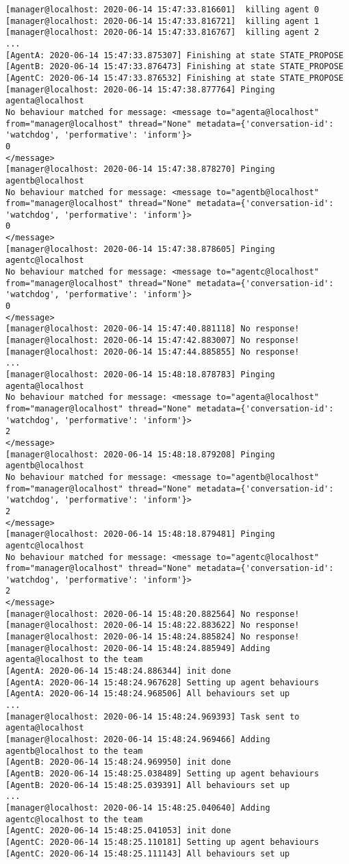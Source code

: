 \begin{lstlisting}
[manager@localhost: 2020-06-14 15:47:33.816601]  killing agent 0
[manager@localhost: 2020-06-14 15:47:33.816721]  killing agent 1
[manager@localhost: 2020-06-14 15:47:33.816767]  killing agent 2
...
[AgentA: 2020-06-14 15:47:33.875307] Finishing at state STATE_PROPOSE
[AgentB: 2020-06-14 15:47:33.876473] Finishing at state STATE_PROPOSE
[AgentC: 2020-06-14 15:47:33.876532] Finishing at state STATE_PROPOSE
[manager@localhost: 2020-06-14 15:47:38.877764] Pinging agenta@localhost
No behaviour matched for message: <message to="agenta@localhost" from="manager@localhost" thread="None" metadata={'conversation-id': 'watchdog', 'performative': 'inform'}>
0
</message>
[manager@localhost: 2020-06-14 15:47:38.878270] Pinging agentb@localhost
No behaviour matched for message: <message to="agentb@localhost" from="manager@localhost" thread="None" metadata={'conversation-id': 'watchdog', 'performative': 'inform'}>
0
</message>
[manager@localhost: 2020-06-14 15:47:38.878605] Pinging agentc@localhost
No behaviour matched for message: <message to="agentc@localhost" from="manager@localhost" thread="None" metadata={'conversation-id': 'watchdog', 'performative': 'inform'}>
0
</message>
[manager@localhost: 2020-06-14 15:47:40.881118] No response!
[manager@localhost: 2020-06-14 15:47:42.883007] No response!
[manager@localhost: 2020-06-14 15:47:44.885855] No response!
...
[manager@localhost: 2020-06-14 15:48:18.878783] Pinging agenta@localhost
No behaviour matched for message: <message to="agenta@localhost" from="manager@localhost" thread="None" metadata={'conversation-id': 'watchdog', 'performative': 'inform'}>
2
</message>
[manager@localhost: 2020-06-14 15:48:18.879208] Pinging agentb@localhost
No behaviour matched for message: <message to="agentb@localhost" from="manager@localhost" thread="None" metadata={'conversation-id': 'watchdog', 'performative': 'inform'}>
2
</message>
[manager@localhost: 2020-06-14 15:48:18.879481] Pinging agentc@localhost
No behaviour matched for message: <message to="agentc@localhost" from="manager@localhost" thread="None" metadata={'conversation-id': 'watchdog', 'performative': 'inform'}>
2
</message>
[manager@localhost: 2020-06-14 15:48:20.882564] No response!
[manager@localhost: 2020-06-14 15:48:22.883622] No response!
[manager@localhost: 2020-06-14 15:48:24.885824] No response!
[manager@localhost: 2020-06-14 15:48:24.885949] Adding agenta@localhost to the team
[AgentA: 2020-06-14 15:48:24.886344] init done
[AgentA: 2020-06-14 15:48:24.967628] Setting up agent behaviours
[AgentA: 2020-06-14 15:48:24.968506] All behaviours set up
...
[manager@localhost: 2020-06-14 15:48:24.969393] Task sent to agenta@localhost
[manager@localhost: 2020-06-14 15:48:24.969466] Adding agentb@localhost to the team
[AgentB: 2020-06-14 15:48:24.969950] init done
[AgentB: 2020-06-14 15:48:25.038489] Setting up agent behaviours
[AgentB: 2020-06-14 15:48:25.039391] All behaviours set up
...
[manager@localhost: 2020-06-14 15:48:25.040640] Adding agentc@localhost to the team
[AgentC: 2020-06-14 15:48:25.041053] init done
[AgentC: 2020-06-14 15:48:25.110181] Setting up agent behaviours
[AgentC: 2020-06-14 15:48:25.111143] All behaviours set up

\end{lstlisting}